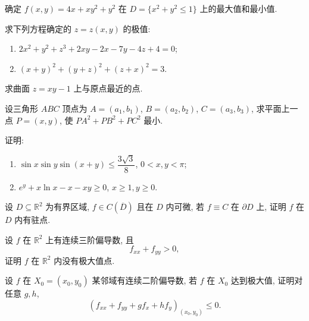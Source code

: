 \documentclass[../../数学分析培优讲义.tex]{subfiles}
\begin{document}
\begin{example}
确定 $f(x,y)=4x+xy^2+y^2$ 在 $D=\{x^2+y^2\leq1\}$ 上的最大值和最小值.
\end{example}
\exampleblank

\begin{example}
求下列方程确定的 $z=z(x,y)$ 的极值:
\begin{enumerate}[label=(\arabic*)]
    \item $2x^2+y^2+z^3+2xy-2x-7y-4z+4=0$;
    \item $(x+y)^2+(y+z)^2+(z+x)^2=3$.
\end{enumerate}
\end{example}
\exampleblank

\begin{example}
求曲面 $z=xy-1$ 上与原点最近的点.
\end{example}
\exampleblank

\begin{example}
设三角形 $ABC$ 顶点为 $A=(a_1,b_1)$, $B=(a_2,b_2)$, $C=(a_3,b_3)$, 求平面上一点 $P=(x,y)$, 使 $PA^2+PB^2+PC^2$ 最小.
\end{example}
\exampleblank

\begin{example}
证明:
\begin{enumerate}[label=(\arabic*)]
    \item $\sin x\sin y\sin(x+y)\leq\dfrac{3\sqrt3}{8}$, $0<x,y<\pi$;
    \item $e^y+x\ln x-x-xy\geq0$, $x\geq1,y\geq0$.
\end{enumerate}
\end{example}
\exampleblank

\begin{example}
设 $D\subseteq\mathbb{R}^2$ 为有界区域, $f\in C(\overline D)$ 且在 $D$ 内可微, 若 $f\equiv C$ 在 $\partial D$ 上, 证明 $f$ 在 $D$ 内有驻点.
\end{example}
\exampleblank

\begin{example}
设 $f$ 在 $\mathbb{R}^2$ 上有连续三阶偏导数, 且
\[
    f_{xx}+f_{yy}>0,
\]
证明 $f$ 在 $\mathbb{R}^2$ 内没有极大值点.
\end{example}
\exampleblank

\begin{example}
设 $f$ 在 $X_0=(x_0,y_0)$ 某邻域有连续二阶偏导数, 若 $f$ 在 $X_0$ 达到极大值, 证明对任意 $g,h$,
\[
    \left(f_{xx}+f_{yy}+gf_x+hf_y\right)_{(x_0,y_0)}\leq0.
\]
\end{example}
\exampleblank
\end{document}
